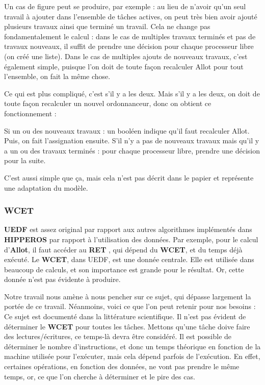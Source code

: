 		Un cas de figure peut se produire, par exemple : au lieu de n'avoir qu'un seul travail à ajouter dans 
		l'ensemble de tâches actives, on peut très bien avoir ajouté plusieurs travaux ainsi que terminé un travail.
		Cela ne change pas fondamentalement le calcul : dans le cas de multiples travaux terminés et pas de travaux nouveaux, 
		il suffit de prendre une décision pour chaque processeur libre (on créé une liste).
		Dans le cas de multiples ajouts de nouveaux travaux, c'est également simple, puisque l'on 
		doit de toute façon recalculer Allot pour tout l'ensemble, on fait la même chose. 
		
		Ce qui est plus compliqué, c'est s'il y a les deux. Mais s'il y a les deux, on doit 
		de toute façon recalculer un nouvel ordonnanceur, donc on obtient ce fonctionnement :
		
		Si un ou des nouveaux travaux : un booléen indique qu'il faut recalculer Allot. Puis, 
		on fait l'assignation ensuite.
		S'il n'y a pas de nouveaux travaux mais qu'il y a un ou des travaux terminés :
		pour chaque processeur libre, prendre une décision pour la suite.\newline
		
		C'est aussi simple que ça, mais cela n'est pas décrit dans le papier et représente une 
		adaptation du modèle.
	
	
		
	\subsubsection{WCET}
		\textbf{UEDF} est assez original par rapport aux autres algorithmes implémentés dans \textbf{HIPPEROS} 
		par rapport à l'utilisation des données. Par exemple, pour le calcul d'\textbf{Allot}, il faut accéder 
		au \textbf{RET} , qui dépend du \textbf{WCET}, et du temps déjà exécuté. 
		Le \textbf{WCET}, dans UEDF, est une donnée centrale. Elle est utilisée dans beaucoup de calculs, et 
		son importance est grande pour le résultat. Or, cette donnée n'est pas évidente à produire. \newline
		
		Notre travail nous amène à nous pencher sur ce sujet, qui dépasse largement la portée de ce travail. 
		Néanmoins, voici ce que l'on peut retenir pour nos besoins :\\
		Ce sujet est documenté dans la littérature scientifique. Il n'est pas évident de déterminer le 
		\textbf{WCET} pour toutes les tâches. Mettons qu'une tâche doive faire des lectures/écritures, 
		ce temps-là devra être considéré. Il est possible de déterminer le nombre d'instructions, 
		et donc un temps théorique en fonction de la machine utilisée pour l'exécuter, mais cela dépend 
		parfois de l'exécution. En effet, certaines opérations, en fonction des données, ne vont pas prendre 
		le même temps, or, ce que l'on cherche à déterminer et le pire des cas.\newline
	
